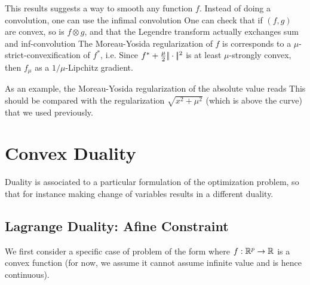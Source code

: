 This results suggests a way to smooth any function $f$. Instead of doing a convolution, one can use the infimal convolution
One can check that if $(f,g)$ are convex, so is $f \otimes g$, and that the Legendre transform actually exchanges sum and inf-convolution
The Moreau-Yosida regularization of $f$ is corresponds to a $\mu$-strict-convexification of $f^*$, i.e.
Since $f^* + \frac{\mu}{2}|\!| \cdot |\!|^2$ is at least $\mu$-strongly convex, then $f_\mu$ as a $1/\mu$-Lipchitz gradient.

As an example, the Moreau-Yosida regularization of the absolute value reads
This should be compared with the regularization $\sqrt{x^2+\mu^2}$ (which is above the curve) that we used previously. 



\section{Convex Duality}
\label{sec-cvx-duality}

Duality is associated to a particular formulation of the optimization problem, so that for instance making change of variables results in a different duality. 

\subsection{Lagrange Duality: Afine Constraint}

We first consider a specific case of problem of the form
where $f : \mathbb{R}^p \rightarrow \mathbb{R}$ is a convex function  (for now, we assume it cannot assume infinite value and is hence continuous).


